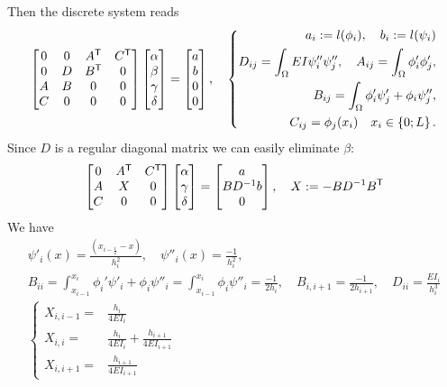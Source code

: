 %
Then the discrete system reads
%
\begin{equation}\label{eq:}
\begin{bmatrix}
0 & 0 & \transpose{A}& \transpose{C}\\
0 & D & \transpose{B}& 0\\
A & B & 0 & 0\\
C & 0 & 0 & 0
\end{bmatrix}
\begin{bmatrix}
\alpha \\ \beta \\ \gamma\\ \delta
\end{bmatrix}
=
\begin{bmatrix}
a \\ b \\ 0\\ 0
\end{bmatrix},\quad
%
\left\{
\begin{aligned}
a_i := l(\phi_i), \quad b_i:=l(\psi_i)\\
D_{ij} = \int_{\Omega} EI\psi_i''\psi''_j,\quad
A_{ij} = \int_{\Omega} \phi_i'\phi'_j,\\
B_{ij} = \int_{\Omega} \phi_i'\psi'_j+\phi_i\psi''_j,\\
C_{ij} = \phi_j(x_i) \quad x_i\in\Set{0;L}.
\end{aligned}
\right.
%
\end{equation}
%
Since $D$ is a regular diagonal matrix we can easily eliminate $\beta$:
%
\begin{align*}
\begin{bmatrix}
0 & {A}^{\mathsf{T}}& {C}^{\mathsf{T}}\\
A & X& 0\\
C & 0  & 0
\end{bmatrix}
\begin{bmatrix}
\alpha \\  \gamma\\ \delta
\end{bmatrix}
=
\begin{bmatrix}
a  \\ BD^{-1}b\\ 0
\end{bmatrix},\quad X:= -BD^{-1}{B}^{\mathsf{T}}
\end{align*}
%
We have
%
\begin{align*}
\psi'_i(x)=\frac{(x_{i-\frac12} -x)}{h_i^2},\quad
\psi''_i(x)=\frac{-1}{h_i^2},\\
B_{ii} = \int_{x_{i-1}}^{x_i} \phi_i'\psi'_i+\phi_i\psi''_i = \int_{x_{i-1}}^{x_i} \phi_i\psi''_i = \frac{-1}{2h_i},\quad
B_{i,i+1} = \frac{-1}{2h_{i+1}}, \quad D_{ii} = \frac{EI_i}{h_i^3}\\
%
\left\{
\begin{aligned}
X_{i,i-1} =& \frac{h_i}{4EI_i}\\
X_{i,i} =& \frac{h_i}{4EI_i}+\frac{h_{i+1}}{4EI_{i+1}}\\
X_{i,i+1} =& \frac{h_{i+1}}{4EI_{i+1}}
\end{aligned}
\right.
%
\end{align*}
%

%
%
\printbibliography[title=References Section~\thesection]
